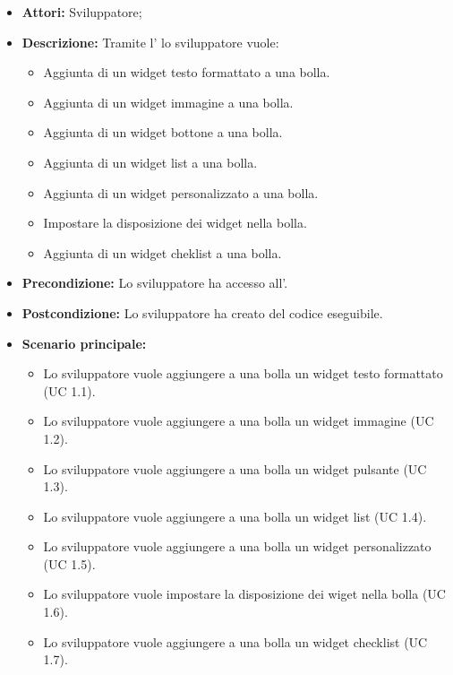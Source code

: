 \FloatBarrier
\begin{itemize}
\item \textbf{Attori:} Sviluppatore;
\item \textbf{Descrizione:} Tramite l' lo sviluppatore vuole:
	\begin{itemize}
	\item{Aggiunta di un widget testo formattato a una bolla.} 
	\item{Aggiunta di un widget immagine a una bolla.}
	\item{Aggiunta di un widget bottone a una bolla.}
	\item{Aggiunta di un widget list a una bolla.}
	\item{Aggiunta di un widget personalizzato a una bolla.}
	\item{Impostare la disposizione dei widget nella bolla.}
	\item{Aggiunta di un widget cheklist a una bolla.}
	\end{itemize} 
\item \textbf{Precondizione:} Lo sviluppatore ha accesso all'.
\item \textbf{Postcondizione:} Lo sviluppatore ha creato del codice eseguibile. 
\item \textbf{Scenario principale:}
	\begin{itemize}
	\item{Lo sviluppatore vuole aggiungere a una bolla un widget testo formattato (UC 1.1).}
	\item{Lo sviluppatore vuole aggiungere a una bolla un widget immagine (UC 1.2).}
	\item{Lo sviluppatore vuole aggiungere a una bolla un widget pulsante (UC 1.3).}
	\item{Lo sviluppatore vuole aggiungere a una bolla un widget list (UC 1.4).}
	\item{Lo sviluppatore vuole aggiungere a una bolla un widget personalizzato (UC 1.5).}
	\item{Lo sviluppatore vuole impostare la disposizione dei wiget nella bolla (UC 1.6).}
	\item{Lo sviluppatore vuole aggiungere a una bolla un widget checklist (UC 1.7).}
	\end{itemize}
\end{itemize}